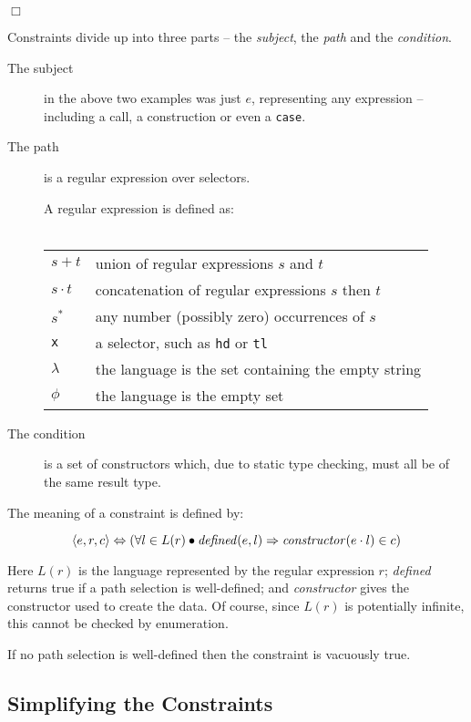 \documentclass[preprint]{sigplanconf}
\newcommand{\T}[1]{\texttt{#1}}
\newcommand{\tup}[1]{\ensuremath{\langle #1 \rangle}}
\newcommand{\noexample}{\hfill$\Box$}
\newcommand{\K}{\ensuremath{^\ast}} %
\newcommand{\D}{\ensuremath{\cdot}} %
\begin{document}
\noexample

Constraints divide up into three parts -- the \textit{subject}, the
\textit{path} and the \textit{condition}.

\begin{description}
\item[The subject] in the above two examples was just $e$,
representing any expression -- including a call, a construction or
even a \T{case}.

\item[The path] is a regular expression over selectors.

A regular expression is defined as:\\ \\
\begin{tabular}{ll}
$s+t$ & union of regular expressions $s$ and $t$ \\
$s\D t$ & concatenation of regular expressions $s$ then $t$ \\
$s\K$  & any number (possibly zero) occurrences of $s$ \\
\T{x} & a selector, such as \T{hd} or \T{tl} \\
$\lambda$ & the language is the set containing the empty string \\
$\phi$ & the language is the empty set
\end{tabular}

\item[The condition] is a set of constructors which, due to static type
checking, must all be of the same result type.
\end{description}

The meaning of a constraint is defined by:

\[ \tup{e,r,c} \Leftrightarrow (\forall l \in L(r) \bullet
\text{\textit{defined}}(e,l) \Rightarrow
\text{\textit{constructor}}(e\D{}l) \in c )
\]

\noindent Here $L(r)$ is the language represented by the regular
expression $r$; \textit{defined} returns true if a path selection is
well-defined; and \textit{constructor} gives the constructor used to
create the data. Of course, since $L(r)$ is potentially infinite,
this cannot be checked by enumeration.

If no path selection is well-defined then the constraint is
vacuously true.

\subsection{Simplifying the Constraints}
\label{sec:constraint_simplify}
\end{document}
